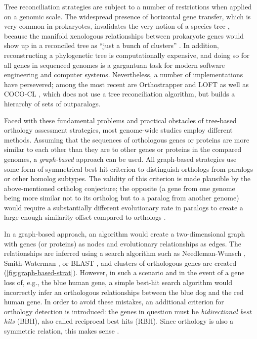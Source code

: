 Tree reconciliation strategies are subject to a number of restrictions when
applied on a genomic scale. The widespread presence of horizontal gene transfer,
which is very common in prokaryotes, invalidates the very notion of a species
tree \citep{doolittle2000}, because the manifold xenologous relationships
between prokaryote genes would show up in a reconciled tree as ``just a bunch of
clusters'' . In addition, reconstructing a phylogenetic tree is
computationally expensive, and doing so for all genes in sequenced genomes is a
gargantuan task for modern software engineering and computer systems.
Nevertheless, a number of implementations have persevered; among the most recent
are Orthostrapper \citep{jothi2006} and LOFT \citep{van_der_heijden2007} as well
as \mbox{COCO-CL} \citep{storm2002}, which does not use a tree reconciliation
algorithm, but builds a hierarchy of sets of outparalogs. 

Faced with these fundamental problems and practical obstacles of tree-based
orthology assessment strategies, most genome-wide studies employ different
methods. Assuming that the sequences of orthologous genes or proteins are more
similar to each other than they are to other genes or proteins in the compared
genomes, a \emph{graph-based} approach can be used. All graph-based strategies
use some form of symmetrical best hit criterion to distinguish orthologs from
paralogs or other homolog subtypes. The validity of this criterion is made
plausible by the above-mentioned ortholog conjecture; the opposite (a gene from
one genome being more similar not to its ortholog but to a paralog from another
genome) would require a substantially different evolutionary rate in paralogs to
create a large enough similarity offset compared to orthologs \citep{koonin2005}.

In a graph-based approach, an algorithm would create a two-dimensional graph
with genes (or proteins) as nodes and evolutionary relationships as edges. The
relationships are inferred using a search algorithm such as Needleman-Wunsch
\citeyearpar{needleman1970}, Smith-Waterman \citeyearpar{smith1981}, or BLAST
\citep{altschul1990}, and clusters of orthologous genes are created
(\autoref{fig:graph-based-strat}). However, in such a scenario and in the event
of a gene loss of, e.g., the blue human gene, a simple best-hit search algorithm
would incorrectly infer an orthologous relationships between the blue dog and
the red human gene. In order to avoid these mistakes, an additional criterion
for orthology detection is introduced: the genes in question must be
\emph{bidirectional best hits} (BBH), also called reciprocal best hits (RBH).
Since orthology is also a symmetric relation, this makes sense .

